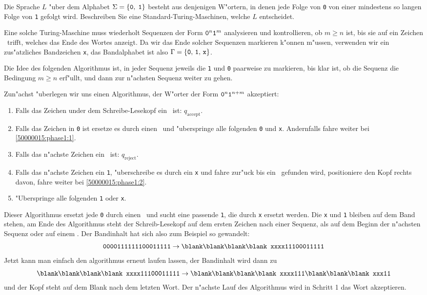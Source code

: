 Die Sprache $L$ "uber dem Alphabet $\Sigma = \{{\tt 0},\;{\tt 1}\}$
besteht aus denjenigen W"ortern, in denen jede Folge von {\tt 0}
von einer mindestens so langen Folge von {\tt 1} gefolgt wird.
Beschreiben Sie eine Standard-Turing-Maschinen, welche $L$
entscheidet.

\begin{loesung}
Eine solche Turing-Maschine muss wiederholt Sequenzen der
Form ${\tt 0}^n{\tt 1}^m$ analysieren und kontrollieren, ob $m \ge n$ ist,
bis sie auf ein Zeichen \blank\ trifft, welches das Ende des
Wortes anzeigt. Da wir das Ende solcher Sequenzen markieren 
k"onnen m"ussen, verwenden wir ein zus"atzliches Bandzeichen
{\tt x}, das Bandalphabet ist also $\Gamma
=\{{\tt 0},\,{\tt 1},\,{\tt x}\}$.

Die Idee des folgenden Algorithmus ist, in jeder Sequenz jeweils
die {\tt 1} und {\tt 0} paarweise zu markieren, bis klar ist,
ob die Sequenz die Bedingung $m\ge n$ erf"ullt, und dann zur
n"achsten Sequenz weiter zu gehen.

Zun"achst "uberlegen wir uns einen Algorithmus, der W"orter der Form
${\tt 0}^n{\tt 1}^{n+m}$ akzeptiert:
\begin{enumerate}
\item Falls das Zeichen under dem Schreibe-Lesekopf ein \blank\ ist:
$q_\text{accept}$.
\item
\label{50000015:phase1:2}
Falls das Zeichen in {\tt 0} ist ersetze es durch einen \blank\ und
"uberspringe alle folgenden {\tt 0} und {\tt x}.
Andernfalls fahre weiter bei \ref{50000015:phase1:1}.
\item
Falls das n"achste Zeichen ein \blank\ ist: $q_\text{reject}$.
\item
Falls das n"achste Zeichen ein {\tt 1}, "uberschreibe es durch ein {\tt x}
und fahre zur"uck bis ein \blank\ gefunden wird, positioniere den Kopf
rechts davon, fahre weiter bei \ref{50000015:phase1:2}.
\item
\label{50000015:phase1:1}
"Uberspringe alle folgenden {\tt 1} oder {\tt x}.
\end{enumerate}
Dieser Algorithmus ersetzt jede {\tt 0} durch einen \blank\ und sucht eine
passende {\tt 1}, die durch {\tt x} ersetzt werden.
Die {\tt x} und {\tt 1} bleiben auf dem Band stehen, am Ende des Algorithmus
steht der Schreib-Lesekopf auf dem ersten Zeichen nach einer Sequenz,
als auf dem Beginn der n"achsten Sequenz oder auf einem \blank.
Der Bandinhalt hat sich also zum Beispiel so gewandelt:
\[
\text {\tt 0000111111100011111}
\rightarrow
\text {\tt \blank\blank\blank\blank xxxx11100011111}
\]
Jetzt kann man einfach den algorithmus erneut laufen lassen, der Bandinhalt
wird dann zu
\[
\text {\tt \blank\blank\blank\blank xxxx11100011111}
\rightarrow
\text {\tt \blank\blank\blank\blank xxxx111\blank\blank\blank xxx11}
\]
und der Kopf steht auf dem Blank nach dem letzten Wort.
Der n"achste Lauf des Algorithmus wird in Schritt 1 das Wort akzeptieren.


\end{loesung}

